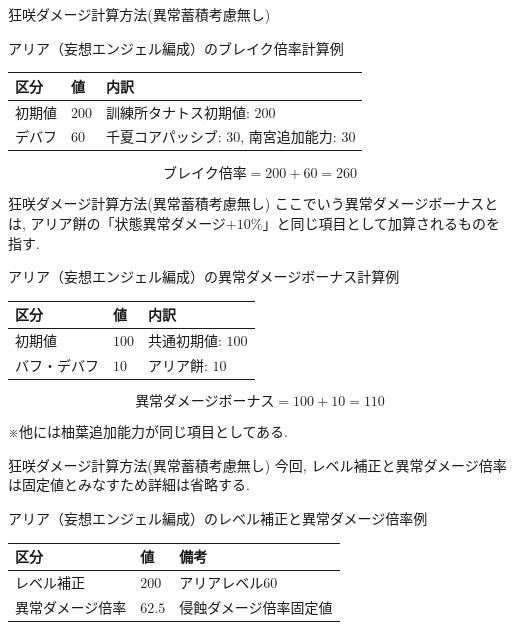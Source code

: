 \documentclass[aspectratio=169]{beamer}
\begin{document}
\begin{frame}{狂咲ダメージ計算方法(異常蓄積考慮無し)}
\begin{block}{アリア（妄想エンジェル編成）のブレイク倍率計算例}
\small
\begin{tabularx}{\linewidth}{@{}l l X@{}}
区分 & 値 & 内訳 \\
\midrule
初期値 & $200$ & 訓練所タナトス初期値: $200$ \\
\midrule
デバフ & $60$ &千夏コアパッシブ: $30$, 南宮追加能力: $30$ \\
\midrule
\end{tabularx}

\vspace{0.4em}
\[
  \text{ブレイク倍率} =200 + 60 = 260
\]
\end{block}
\end{frame}


\begin{frame}{狂咲ダメージ計算方法(異常蓄積考慮無し)}
ここでいう異常ダメージボーナスとは, アリア餅の「状態異常ダメージ$+10\%$」と同じ項目として加算されるものを指す.
\begin{block}{アリア（妄想エンジェル編成）の異常ダメージボーナス計算例}
\small
\begin{tabularx}{\linewidth}{@{}l l X@{}}
区分 & 値 & 内訳 \\
\midrule
初期値 & $100$ & 共通初期値: $100$ \\
\midrule
バフ・デバフ & $10$ & アリア餅: $10$ \\
\midrule
\end{tabularx}

\vspace{0.4em}
\[
  \text{異常ダメージボーナス} = 100 + 10 = 110
\]
\end{block}
※他には柚葉追加能力が同じ項目としてある.
\end{frame}


\begin{frame}{狂咲ダメージ計算方法(異常蓄積考慮無し)}
今回, レベル補正と異常ダメージ倍率は固定値とみなすため詳細は省略する.
\begin{block}{アリア（妄想エンジェル編成）のレベル補正と異常ダメージ倍率例}
\small
\begin{tabularx}{\linewidth}{@{}l l X@{}}
区分 & 値 & 備考 \\
\midrule
レベル補正 & $200$ & アリアレベル$60$ \\
\midrule
異常ダメージ倍率 & $62.5$ & 侵蝕ダメージ倍率固定値 \\
\end{tabularx}
\end{block}
\end{frame}
\end{document}
